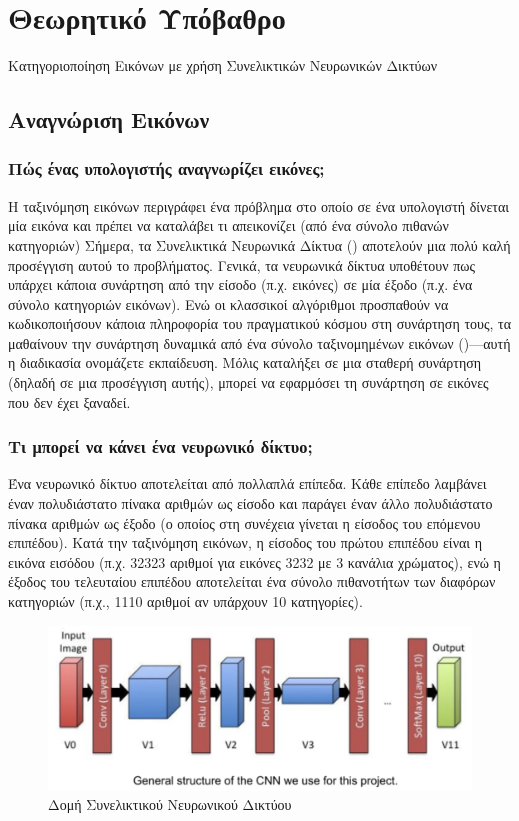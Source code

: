 \chapter{Θεωρητικό Υπόβαθρο}
Κατηγοριοποίηση Εικόνων με χρήση Συνελικτικών Νευρωνικών Δικτύων  

\section{Αναγνώριση Εικόνων}
\subsection{Πώς ένας υπολογιστής αναγνωρίζει εικόνες;}
Η ταξινόμηση εικόνων περιγράφει ένα πρόβλημα στο οποίο σε ένα υπολογιστή δίνεται μία εικόνα και πρέπει να καταλάβει τι απεικονίζει (από ένα σύνολο πιθανών κατηγοριών)
Σήμερα, τα Συνελικτικά Νευρωνικά Δίκτυα () αποτελούν  μια πολύ καλή  προσέγγιση αυτού το προβλήματος. Γενικά, τα νευρωνικά δίκτυα υποθέτουν πως υπάρχει κάποια συνάρτηση από την είσοδο (π.χ. εικόνες) σε μία έξοδο (π.χ. ένα σύνολο κατηγοριών εικόνων). Ενώ οι κλασσικοί αλγόριθμοι προσπαθούν να κωδικοποιήσουν  κάποια πληροφορία του πραγματικού κόσμου στη συνάρτηση τους, τα  μαθαίνουν την συνάρτηση δυναμικά  από ένα σύνολο ταξινομημένων εικόνων ()—αυτή η διαδικασία ονομάζετε εκπαίδευση. Μόλις καταλήξει σε μια σταθερή συνάρτηση (δηλαδή σε μια προσέγγιση αυτής), μπορεί να εφαρμόσει τη συνάρτηση σε εικόνες που δεν έχει ξαναδεί.
\subsection{Τι μπορεί να κάνει ένα νευρωνικό δίκτυο;}
Ένα νευρωνικό δίκτυο αποτελείται από πολλαπλά επίπεδα.  Κάθε επίπεδο λαμβάνει έναν πολυδιάστατο πίνακα αριθμών ως είσοδο και παράγει έναν άλλο πολυδιάστατο πίνακα αριθμών ως έξοδο (ο οποίος στη συνέχεια γίνεται η είσοδος του επόμενου επιπέδου). Κατά την ταξινόμηση εικόνων, η είσοδος του πρώτου επιπέδου είναι η εικόνα εισόδου  (π.χ. 32323 αριθμοί για εικόνες 3232  με 3 κανάλια χρώματος), ενώ η έξοδος του τελευταίου επιπέδου αποτελείται  ένα σύνολο πιθανοτήτων των διαφόρων κατηγοριών (π.χ., 1110 αριθμοί αν υπάρχουν 10 κατηγορίες).

\begin{figure}[!ht] \centering 
\includegraphics[width=\textwidth]{static/figures/network.png} \caption{Δομή Συνελικτικού Νευρωνικού Δικτύου}\label{figureCNN}
\end{figure}

